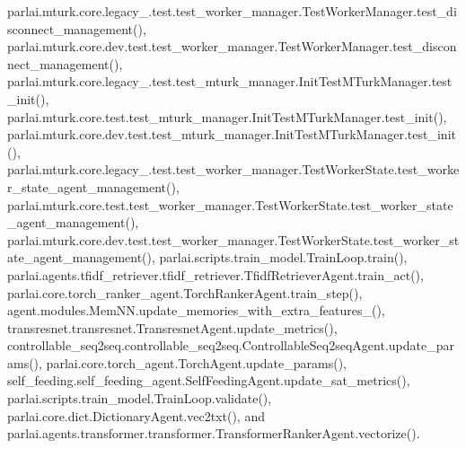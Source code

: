 parlai.\+mturk.\+core.\+legacy\+\_.\+test.\+test\+\_\+worker\+\_\+manager.\+Test\+Worker\+Manager.\+test\+\_\+disconnect\+\_\+management(), parlai.\+mturk.\+core.\+dev.\+test.\+test\+\_\+worker\+\_\+manager.\+Test\+Worker\+Manager.\+test\+\_\+disconnect\+\_\+management(), parlai.\+mturk.\+core.\+legacy\+\_.\+test.\+test\+\_\+mturk\+\_\+manager.\+Init\+Test\+M\+Turk\+Manager.\+test\+\_\+init(), parlai.\+mturk.\+core.\+test.\+test\+\_\+mturk\+\_\+manager.\+Init\+Test\+M\+Turk\+Manager.\+test\+\_\+init(), parlai.\+mturk.\+core.\+dev.\+test.\+test\+\_\+mturk\+\_\+manager.\+Init\+Test\+M\+Turk\+Manager.\+test\+\_\+init(), parlai.\+mturk.\+core.\+legacy\+\_.\+test.\+test\+\_\+worker\+\_\+manager.\+Test\+Worker\+State.\+test\+\_\+worker\+\_\+state\+\_\+agent\+\_\+management(), parlai.\+mturk.\+core.\+test.\+test\+\_\+worker\+\_\+manager.\+Test\+Worker\+State.\+test\+\_\+worker\+\_\+state\+\_\+agent\+\_\+management(), parlai.\+mturk.\+core.\+dev.\+test.\+test\+\_\+worker\+\_\+manager.\+Test\+Worker\+State.\+test\+\_\+worker\+\_\+state\+\_\+agent\+\_\+management(), parlai.\+scripts.\+train\+\_\+model.\+Train\+Loop.\+train(), parlai.\+agents.\+tfidf\+\_\+retriever.\+tfidf\+\_\+retriever.\+Tfidf\+Retriever\+Agent.\+train\+\_\+act(), parlai.\+core.\+torch\+\_\+ranker\+\_\+agent.\+Torch\+Ranker\+Agent.\+train\+\_\+step(), agent.\+modules.\+Mem\+N\+N.\+update\+\_\+memories\+\_\+with\+\_\+extra\+\_\+features\+\_\+(), transresnet.\+transresnet.\+Transresnet\+Agent.\+update\+\_\+metrics(), controllable\+\_\+seq2seq.\+controllable\+\_\+seq2seq.\+Controllable\+Seq2seq\+Agent.\+update\+\_\+params(), parlai.\+core.\+torch\+\_\+agent.\+Torch\+Agent.\+update\+\_\+params(), self\+\_\+feeding.\+self\+\_\+feeding\+\_\+agent.\+Self\+Feeding\+Agent.\+update\+\_\+sat\+\_\+metrics(), parlai.\+scripts.\+train\+\_\+model.\+Train\+Loop.\+validate(), parlai.\+core.\+dict.\+Dictionary\+Agent.\+vec2txt(), and parlai.\+agents.\+transformer.\+transformer.\+Transformer\+Ranker\+Agent.\+vectorize().

\mbox{\label{classparlai_1_1agents_1_1legacy__agents_1_1seq2seq_1_1modules__v0_1_1Seq2seq_aa8abe77993316832af5601bf342dbe9d}} 
